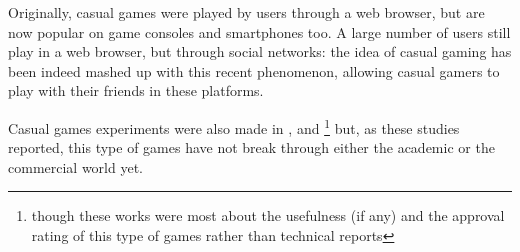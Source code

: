 Originally, casual games were played by users through a web browser, but are
now popular on game consoles and smartphones too. A large number of users still
play in a web browser, but through social networks: the idea of casual gaming
has been indeed mashed up with this recent phenomenon, allowing casual gamers to
play with their friends in these platforms.

Casual games experiments were also made in \cite{bib:ppav-casual},
\cite{bib:li-k-social-casual} and \cite{bib:mob-health-casual}\footnote{though
these works were most about the usefulness (if any) and the approval rating of
this type of games rather than technical reports} but, as these studies
reported, this type of games have not break through either the academic or the
commercial world yet.
